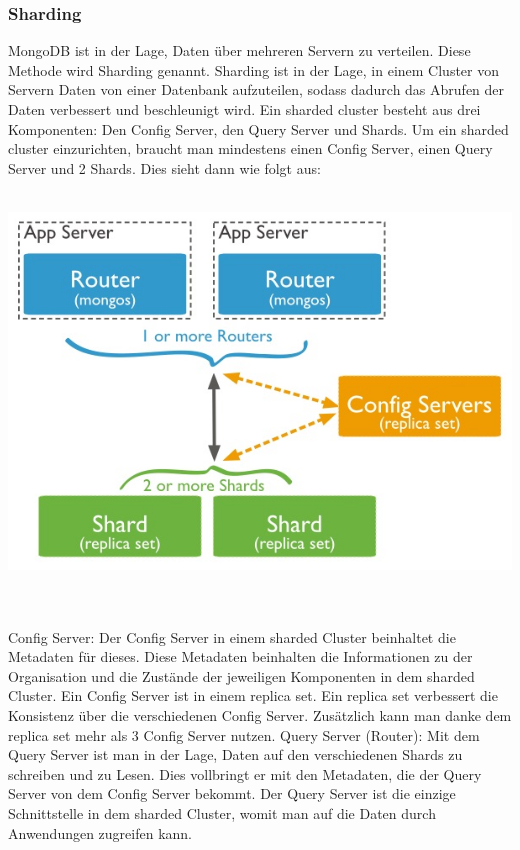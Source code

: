 \subsubsection{Sharding}
MongoDB ist in der Lage, Daten \"uber mehreren Servern zu verteilen. Diese Methode wird Sharding genannt. Sharding ist in der Lage, in einem Cluster von Servern Daten von einer Datenbank aufzuteilen, sodass dadurch das Abrufen der Daten verbessert und beschleunigt wird. Ein sharded cluster besteht aus drei Komponenten: Den Config Server, den Query Server und Shards. Um ein sharded cluster einzurichten, braucht man mindestens einen Config Server, einen Query Server und 2 Shards. Dies sieht dann wie folgt aus:
\\
\\
\begin{minipage}{\textwidth}
    \centering
    \includegraphics[scale=1.0]{images/01_sharded-cluster-production-architecture.jpg}
    \label{fig:ver}
\end{minipage}
\\
\\
Config Server: Der Config Server in einem sharded Cluster beinhaltet die Metadaten f\"ur dieses. Diese Metadaten beinhalten die Informationen zu der Organisation und die Zust\"ande der jeweiligen Komponenten in dem sharded Cluster.  Ein Config Server ist in einem replica set. Ein replica set verbessert die Konsistenz \"uber die verschiedenen Config Server. Zus\"atzlich kann man danke dem replica set mehr als 3 Config Server nutzen.
Query Server (Router): Mit dem Query Server ist man in der Lage, Daten auf den verschiedenen Shards zu schreiben und zu Lesen. Dies vollbringt er mit den Metadaten, die der Query Server von dem Config Server bekommt. Der Query Server ist die einzige Schnittstelle in dem sharded Cluster, womit man auf die Daten durch Anwendungen zugreifen kann. 
